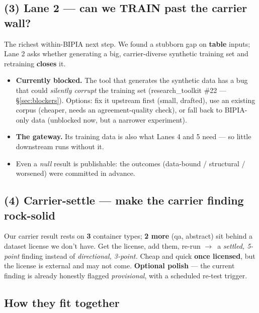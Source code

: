 \documentclass[11pt,parskip=half-]{scrartcl}
\newcommand{\arr}{\ensuremath{\rightarrow}}
\begin{document}
\subsection*{(3) Lane 2 --- can we TRAIN past the carrier wall? }
The richest within-BIPIA next step. We found a stubborn gap on \textbf{table} inputs; Lane 2 asks whether
generating a big, carrier-diverse synthetic training set and retraining \textbf{closes} it.
\begin{itemize}
  \item \textbf{Currently blocked.} The tool that generates the synthetic data has a bug that could
    \emph{silently corrupt} the training set (research\_toolkit \#22 --- \S\ref{sec:blockers}). Options:
    fix it upstream first (small, drafted), use an existing corpus (cheaper, needs an agreement-quality
    check), or fall back to BIPIA-only data (unblocked now, but a narrower experiment).
  \item \textbf{The gateway.} Its training data is also what Lanes 4 and 5 need --- so little downstream
    runs without it.
  \item Even a \emph{null} result is publishable: the outcomes (data-bound / structural / worsened) were
    committed in advance.
\end{itemize}

\subsection*{(4) Carrier-settle --- make the carrier finding rock-solid }
Our carrier result rests on \textbf{3} container types; \textbf{2 more} (qa, abstract) sit behind a
dataset license we don't have. Get the license, add them, re-run \arr\ a \emph{settled, 5-point} finding
instead of \emph{directional, 3-point.} Cheap and quick \textbf{once licensed}, but the license is
external and may not come. \textbf{Optional polish} --- the current finding is already honestly flagged
\emph{provisional}, with a scheduled re-test trigger.

\subsection{How they fit together}
\end{document}

